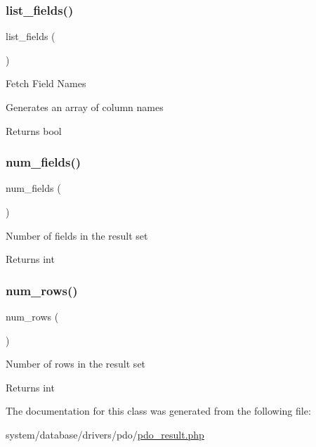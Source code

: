 \subsubsection{\texorpdfstring{list\+\_\+fields()}{list\_fields()}}
{\footnotesize\ttfamily list\+\_\+fields (\begin{DoxyParamCaption}{ }\end{DoxyParamCaption})}

Fetch Field Names

Generates an array of column names

\begin{DoxyReturn}{Returns}
bool 
\end{DoxyReturn}
\mbox{\label{class_c_i___d_b__pdo__result_af831bf363e4d7d661a717a4932af449d}} 
\subsubsection{\texorpdfstring{num\+\_\+fields()}{num\_fields()}}
{\footnotesize\ttfamily num\+\_\+fields (\begin{DoxyParamCaption}{ }\end{DoxyParamCaption})}

Number of fields in the result set

\begin{DoxyReturn}{Returns}
int 
\end{DoxyReturn}
\mbox{\label{class_c_i___d_b__pdo__result_a218657c303ee499b97710ab0cd2f5d6e}} 
\subsubsection{\texorpdfstring{num\+\_\+rows()}{num\_rows()}}
{\footnotesize\ttfamily num\+\_\+rows (\begin{DoxyParamCaption}{ }\end{DoxyParamCaption})}

Number of rows in the result set

\begin{DoxyReturn}{Returns}
int 
\end{DoxyReturn}


The documentation for this class was generated from the following file\+:\begin{DoxyCompactItemize}
\item 
system/database/drivers/pdo/\mbox{\hyperlink{pdo__result_8php}{pdo\+\_\+result.\+php}}\end{DoxyCompactItemize}

